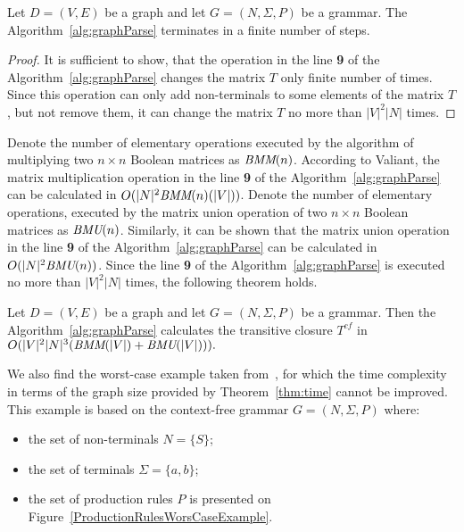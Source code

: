 \begin{mytheorem}\label{thm:finite}
 Let $D = (V,E)$ be a graph and let $G =(N,\Sigma,P)$ be a grammar. The Algorithm~\ref{alg:graphParse} terminates in a finite number of steps. 
\end{mytheorem}
\begin{proof}
It is sufficient to show, that the operation in the line \textbf{9} of the Algorithm~\ref{alg:graphParse} changes the matrix $T$ only finite number of times. Since this operation can only add non-terminals to some elements of the matrix $T$, but not remove them, it can change the matrix $T$ no more than $|V|^2|N|$ times.
\end{proof}

Denote the number of elementary operations executed by the algorithm of multiplying two $n \times n$ Boolean matrices as $\text{\it{BMM}}(n)$. According to Valiant, the matrix multiplication operation in the line \textbf{9} of the Algorithm~\ref{alg:graphParse} can be calculated in $O(|N|^2 \text{\it{BMM}}(n)(|V|))$. Denote the number of elementary operations, executed by the matrix union operation of two $n \times n$ Boolean matrices as $\text{\it{BMU}}(n)$. Similarly, it can be shown that the matrix union operation in the line \textbf{9} of the Algorithm~\ref{alg:graphParse} can be calculated in $O(|N|^2 \text{\it{BMU}}(n))$. Since the line \textbf{9} of the Algorithm~\ref{alg:graphParse} is executed no more than $|V|^2|N|$ times, the following theorem holds.

\begin{mytheorem}\label{thm:time}
Let $D = (V,E)$ be a graph and let $G =(N,\Sigma,P)$ be a grammar. Then the Algorithm~\ref{alg:graphParse} calculates the transitive closure $T^{cf}$ in \\ $O(|V|^2|N|^3(\text{\it{BMM}}(|V|) + \text{\it{BMU}}(|V|))).$
\end{mytheorem}

We also find the worst-case example taken from~\cite{hellingsPathQuerying}, for which the time complexity in terms of the graph size provided by Theorem~\ref{thm:time} cannot be improved. This example is based on the context-free grammar $G = (N, \Sigma, P)$ where:
\begin{itemize}
	\item the set of non-terminals $N = \{S\}$;
	\item the set of terminals $\Sigma = \{a, b\}$;
	\item the set of production rules $P$ is presented on Figure~\ref{ProductionRulesWorsCaseExample}.
\end{itemize}

